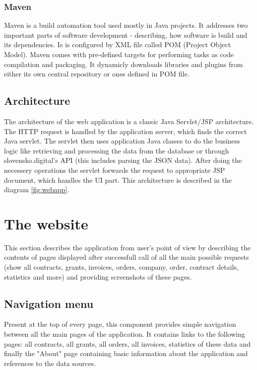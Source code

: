 \documentclass[thesis=B,english]{FITthesis}[2012/06/26]
\begin{document}
	\subsubsection{Maven}
	Maven is a build automation tool used mostly in Java projects. It addresses two important parts of software development - describing, how software is build and its dependencies. Is is configured by XML file called POM (Project Object Model). Maven comes with pre-defined targets for performing tasks as code compilation and packaging. It dynamicly downloads libraries and plugins from either its own central repository or ones defined in POM file.
	
	\subsection{Architecture}
	The architecture of the web application is a classic Java Servlet/JSP architecture. The HTTP request is handled by the application server, which finds the correct Java servlet. The servlet then uses application Java classes to do the business logic like retrieving and processing the data from the database or through slovensko.digital's API (this includes parsing the JSON data). After doing the necessery operations the servlet forwards the request to appropriate JSP document, which handles the UI part. This architecture is described in the diagram \ref{fig:webapp}.


	\section{The website}
	This section describes the application from user's point of view by describing the contents of pages displayed after successfull call of all the main possible requests (show all contracts, grants, invoices, orders, company, order, contract details, statistics and more) and providing screenshots of these pages.
	
	\subsection{Navigation menu}
	Present at the top of every page, this component provides simple navigation between all the main pages of the application. It contains links to the following pages: all contracts, all grants, all orders, all invoices, statistics of these data and finally the "About" page containing basic information about the application and references to the data sources.
\end{document}
